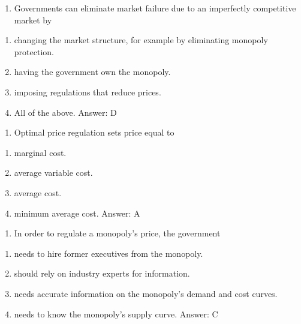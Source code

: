 \documentclass[11pt,]{article}
\providecommand{\tightlist}{%
  \setlength{\itemsep}{0pt}\setlength{\parskip}{0pt}}
\begin{document}
\begin{enumerate}
\def\labelenumi{\arabic{enumi})}
\setcounter{enumi}{8}
\tightlist
\item
  Governments can eliminate market failure due to an imperfectly
  competitive market by
\end{enumerate}

\begin{enumerate}
\def\labelenumi{\Alph{enumi})}
\tightlist
\item
  changing the market structure, for example by eliminating monopoly
  protection.
\item
  having the government own the monopoly.
\item
  imposing regulations that reduce prices.
\item
  All of the above. Answer: D
\end{enumerate}

\begin{enumerate}
\def\labelenumi{\arabic{enumi})}
\setcounter{enumi}{9}
\tightlist
\item
  Optimal price regulation sets price equal to
\end{enumerate}

\begin{enumerate}
\def\labelenumi{\Alph{enumi})}
\tightlist
\item
  marginal cost.
\item
  average variable cost.
\item
  average cost.
\item
  minimum average cost. Answer: A
\end{enumerate}

\begin{enumerate}
\def\labelenumi{\arabic{enumi})}
\setcounter{enumi}{10}
\tightlist
\item
  In order to regulate a monopoly's price, the government
\end{enumerate}

\begin{enumerate}
\def\labelenumi{\Alph{enumi})}
\tightlist
\item
  needs to hire former executives from the monopoly.
\item
  should rely on industry experts for information.
\item
  needs accurate information on the monopoly's demand and cost curves.
\item
  needs to know the monopoly's supply curve. Answer: C
\end{enumerate}
\end{document}

